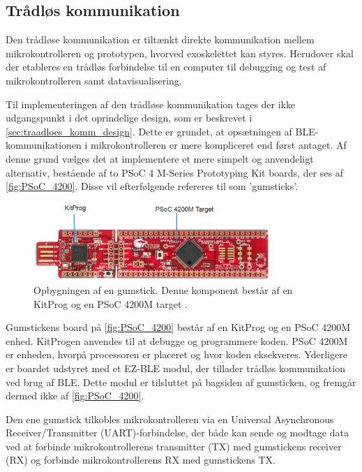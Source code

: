 \subsection{Trådløs kommunikation}\label{traadloes_komm_imp}
Den trådløse kommunikation er tiltænkt direkte kommunikation mellem mikrokontrolleren og prototypen, hvorved exoskelettet kan styres. 
Herudover skal der etableres en trådløs forbindelse til en computer til debugging og test af mikrokontrolleren samt datavisualisering.   

\noindent
Til implementeringen af den trådløse kommunikation tages der ikke udgangspunkt i det oprindelige design, som er beskrevet i \autoref{sec:traadloes_komm_design}. 
Dette er grundet, at opsætningen af BLE-kommunikationen i mikrokontrolleren er mere kompliceret end først antaget.
Af denne grund vælges det at implementere et mere simpelt og anvendeligt alternativ, bestående af to PSoC 4 M-Series Prototyping Kit boards, der ses af \autoref{fig:PSoC_4200}. 
Disse vil efterfølgende refereres til som 'gumsticks'. 

\begin{figure}[H]
	\centering
	\includegraphics[width=0.8\textwidth]{figures/PSoC_4200_opdelt}
	\caption{Opbygningen af en gumstick. Denne komponent består af en KitProg og en PSoC 4200M target \citep{cypresspsoc42015}.}
	\label{fig:PSoC_4200}
\end{figure}

\noindent
Gumstickens board på \autoref{fig:PSoC_4200} består af en KitProg og en PSoC 4200M enhed. KitProgen anvendes til at debugge og programmere koden. PSoC 4200M er enheden, hvorpå processoren er placeret og hvor koden eksekveres. 
Yderligere er boardet udstyret med et EZ-BLE modul, der tillader trådløs kommunikation ved brug af BLE. Dette modul er tilsluttet på bagsiden af gumsticken, og fremgår dermed ikke af \autoref{fig:PSoC_4200}. 

Den ene gumstick tilkobles mikrokontrolleren via en Universal Asynchronous Receiver/Transmitter (UART)-forbindelse, der både kan sende og modtage data ved at forbinde mikrokontrollerens transmitter (TX) med gumstickens receiver (RX) og forbinde mikrokontrollerens RX med gumstickens TX. 

